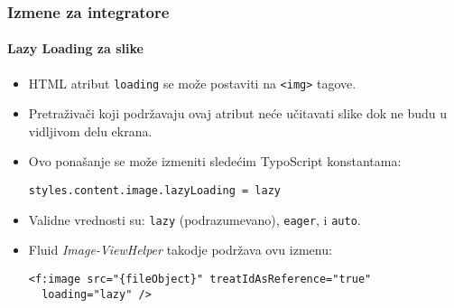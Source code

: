 
\begin{frame}[fragile]
	\frametitle{Izmene za integratore}
	\framesubtitle{Lazy Loading za slike}

	\lstset{basicstyle=\smaller\ttfamily}

	\begin{itemize}
		\item HTML atribut \texttt{loading} se može postaviti na \texttt{<img>} tagove.
		\item Pretraživači koji podržavaju ovaj atribut neće učitavati slike
			dok ne budu u vidljivom delu ekrana.
		\item Ovo ponašanje se može izmeniti sledećim TypoScript konstantama:

\vspace{-0.4cm}
\begin{lstlisting}
styles.content.image.lazyLoading = lazy
\end{lstlisting}

		\item Validne vrednosti su: \texttt{lazy} (podrazumevano), \texttt{eager}, i \texttt{auto}.
		\item Fluid \textit{Image-ViewHelper} takodje podržava ovu izmenu:

\vspace{-0.4cm}
\begin{lstlisting}
<f:image src="{fileObject}" treatIdAsReference="true"
  loading="lazy" />
\end{lstlisting}

	\end{itemize}

\end{frame}


